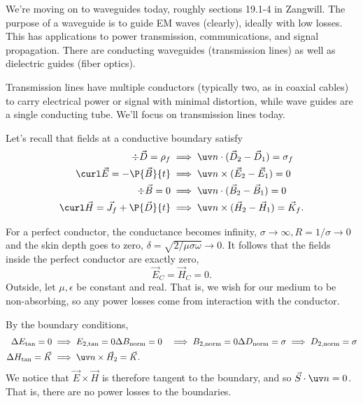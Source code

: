 We're moving on to waveguides today, roughly sections 19.1-4 in Zangwill. The purpose of a waveguide is to guide EM waves (clearly), ideally with low losses. This has applications to power transmission, communications, and signal propagation. There are conducting waveguides (transmission lines) as well as dielectric guides (fiber optics).

Transmission lines have multiple conductors (typically two, as in coaxial cables) to carry electrical power or signal with minimal distortion, while wave guides are a single conducting tube. We'll focus on transmission lines today.

Let's recall that fields at a conductive boundary satisfy
\begin{align}
    \div \vec D = \rho_f &\implies \uv n \cdot (\vec D_2 - \vec D_1) = \sigma_f\\
    \curl\vec E = -\P{\vec B}{t} &\implies \uv n \times (\vec E_2 -\vec E_1) =0\\
    \div \vec B = 0 &\implies \uv n \cdot (\vec B_2 - \vec B_1) = 0\\
    \curl \vec H = \vec J_f + \P{\vec D}{t} &\implies \uv n \times (\vec H_2 -\vec H_1) = \vec K_f.
\end{align}

For a perfect conductor, the conductance becomes infinity, $\sigma \to \infty, R= 1/\sigma \to 0$ and the skin depth goes to zero, $\delta = \sqrt{2/\mu\sigma \omega} \to 0$. It follows that the fields inside the perfect conductor are exactly zero,
\begin{equation}
    \vec E_C = \vec H_C= 0.
\end{equation}
Outside, let $\mu,\epsilon$ be constant and real. That is, we wish for our medium to be non-absorbing, so any power losses come from interaction with the conductor.

By the boundary conditions,
\begin{align}
    \Delta E_\text{tan}=0 &\implies E_{2,\mathrm{tan}}=0
    \Delta B_\text{norm}=0 &\implies B_{2,\mathrm{norm}}=0
    \Delta D_\mathrm{norm}=\sigma \implies D_{2,\mathrm{norm}}=\sigma\\
    \Delta H_\mathrm{tan} = \vec K &\implies \uv n \times \vec H_2 = \vec K.
\end{align}
We notice that $\vec E\times \vec H$ is therefore tangent to the boundary, and so $\vec S \cdot \uv n=0$. That is, there are no power losses to the boundaries.

